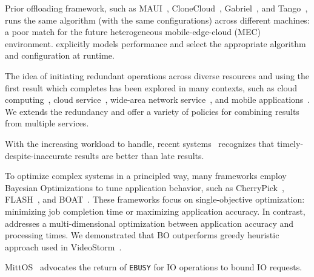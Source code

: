 \documentclass[thesis.tex]{subfiles}
\begin{document}
 Prior offloading framework, such as
MAUI~\cite{cuervo2010maui}, CloneCloud~\cite{chun2011clonecloud},
Gabriel~\cite{ha2014towards}, and Tango~\cite{gordon2015accelerating}, runs the
same algorithm (with the same configurations) across different machines: a poor
match for the future heterogeneous mobile-edge-cloud (MEC)
environment. \sysname{} explicitly models performance and select the appropriate
algorithm and configuration at runtime.

 The idea of initiating redundant operations
across diverse resources and using the first result which completes has been
explored in many contexts, such as cloud
computing~\cite{ananthanarayanan2013effective}, cloud
service~\cite{dean2013tail}, wide-area network service~\cite{vulimiri2013low},
and mobile applications~\cite{gordon2015accelerating}. We extends the redundancy
and offer a variety of policies for combining results from multiple services.

 With the increasing workload to handle, recent
systems~\cite{agarwal2013blinkdb, rabkin2014aggregation, zhang2017live}
recognizes that timely-despite-inaccurate results are better than late
results.

 To optimize complex systems in a principled way,
many frameworks employ Bayesian Optimizations to tune application behavior, such
as CherryPick~\cite{alipourfard2017cherrypick}, FLASH~\cite{zhang2016flash}, and
BOAT~\cite{dalibard2017boat}. These frameworks focus on single-objective
optimization: minimizing job completion time or maximizing application
accuracy. In contrast, \sysname{} addresses a multi-dimensional optimization
between application accuracy and processing times. We demonstrated that BO
outperforms greedy heuristic approach used in VideoStorm~\cite{zhang2017live}.

 MittOS~\cite{hao2017mittos} advocates the return of
\texttt{EBUSY} for IO operations to bound IO requests.
\end{document}
